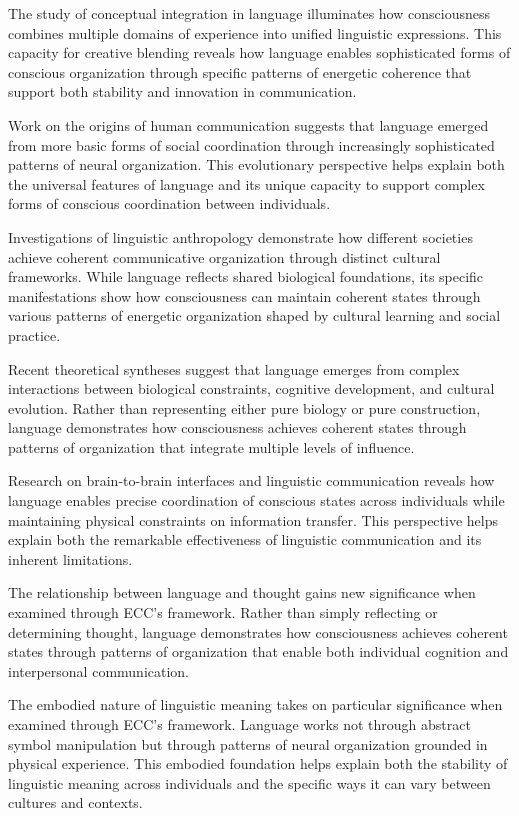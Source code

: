 \begin{refsection}
The study of conceptual integration in language \cite{Fauconnier2002} illuminates how consciousness combines multiple domains of experience into unified linguistic expressions. This capacity for creative blending reveals how language enables sophisticated forms of conscious organization through specific patterns of energetic coherence that support both stability and innovation in communication.

Work on the origins of human communication \cite{Tomasello2008} suggests that language emerged from more basic forms of social coordination through increasingly sophisticated patterns of neural organization. This evolutionary perspective helps explain both the universal features of language and its unique capacity to support complex forms of conscious coordination between individuals.

Investigations of linguistic anthropology \cite{Silverstein1976} demonstrate how different societies achieve coherent communicative organization through distinct cultural frameworks. While language reflects shared biological foundations, its specific manifestations show how consciousness can maintain coherent states through various patterns of energetic organization shaped by cultural learning and social practice.

Recent theoretical syntheses \cite{Christiansen2016} suggest that language emerges from complex interactions between biological constraints, cognitive development, and cultural evolution. Rather than representing either pure biology or pure construction, language demonstrates how consciousness achieves coherent states through patterns of organization that integrate multiple levels of influence.

Research on brain-to-brain interfaces and linguistic communication \cite{Dingemanse2017} reveals how language enables precise coordination of conscious states across individuals while maintaining physical constraints on information transfer. This perspective helps explain both the remarkable effectiveness of linguistic communication and its inherent limitations.

The relationship between language and thought \cite{Whorf1956} gains new significance when examined through ECC's framework. Rather than simply reflecting or determining thought, language demonstrates how consciousness achieves coherent states through patterns of organization that enable both individual cognition and interpersonal communication.

The embodied nature of linguistic meaning \cite{Lakoff1999} takes on particular significance when examined through ECC's framework. Language works not through abstract symbol manipulation but through patterns of neural organization grounded in physical experience. This embodied foundation helps explain both the stability of linguistic meaning across individuals and the specific ways it can vary between cultures and contexts.


\end{refsection}
